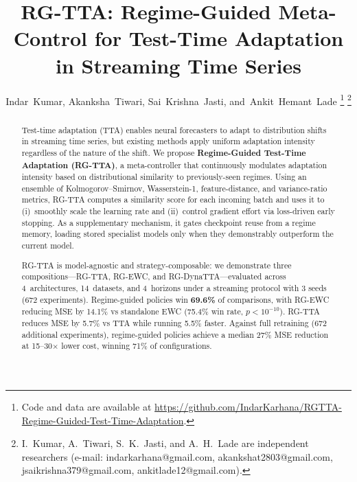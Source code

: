 \documentclass[journal]{IEEEtran}
\newcommand{\repourl}{\url{https://github.com/IndarKarhana/RGTTA-Regime-Guided-Test-Time-Adaptation}}
\begin{document}
\title{RG-TTA: Regime-Guided Meta-Control for Test-Time Adaptation in Streaming Time Series}

\author{Indar~Kumar,
Akanksha~Tiwari,
Sai~Krishna~Jasti,
and~Ankit~Hemant~Lade%
\thanks{Code and data are available at \repourl.}%
\thanks{I.~Kumar, A.~Tiwari, S.~K.~Jasti, and A.~H.~Lade are independent researchers
(e-mail: indarkarhana@gmail.com, akankshat2803@gmail.com,
jsaikrishna379@gmail.com, ankitlade12@gmail.com).}}

\maketitle

\begin{abstract}

Test-time adaptation (TTA) enables neural forecasters to adapt to distribution shifts in streaming time series, but existing methods apply uniform adaptation intensity regardless of the nature of the shift. We propose \textbf{Regime-Guided Test-Time Adaptation (RG-TTA)}, a meta-controller that continuously modulates adaptation intensity based on distributional similarity to previously-seen regimes. Using an ensemble of Kolmogorov--Smirnov, Wasserstein-1, feature-distance, and variance-ratio metrics, RG-TTA computes a similarity score for each incoming batch and uses it to (i)~smoothly scale the learning rate and (ii)~control gradient effort via loss-driven early stopping. As a supplementary mechanism, it gates checkpoint reuse from a regime memory, loading stored specialist models only when they demonstrably outperform the current model.

RG-TTA is model-agnostic and strategy-composable: we demonstrate three compositions---RG-TTA, RG-EWC, and RG-DynaTTA---evaluated across 4~architectures, 14~datasets, and 4~horizons under a streaming protocol with 3 seeds (672 experiments). Regime-guided policies win \textbf{69.6\%} of comparisons, with RG-EWC reducing MSE by 14.1\% vs standalone EWC (75.4\% win rate, $p{<}10^{-10}$). RG-TTA reduces MSE by 5.7\% vs TTA while running 5.5\% faster. Against full retraining (672 additional experiments), regime-guided policies achieve a median 27\% MSE reduction at 15--30$\times$ lower cost, winning 71\% of configurations.

\end{abstract}

\end{document}
